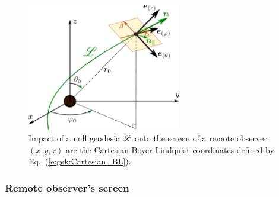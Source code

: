 \begin{figure}
\centerline{\includegraphics[width=0.6\textwidth]{gik_obs_screen.pdf}}
\caption[]{\label{f:gik:obs_screen} \footnotesize
Impact of a null geodesic $\mathscr{L}$ onto the screen of a remote observer. $(x,y,z)$ are the Cartesian Boyer-Lindquist coordinates
defined by Eq.~(\ref{e:gek:Cartesian_BL}).
}
\end{figure}

\subsubsection{Remote observer's screen}


